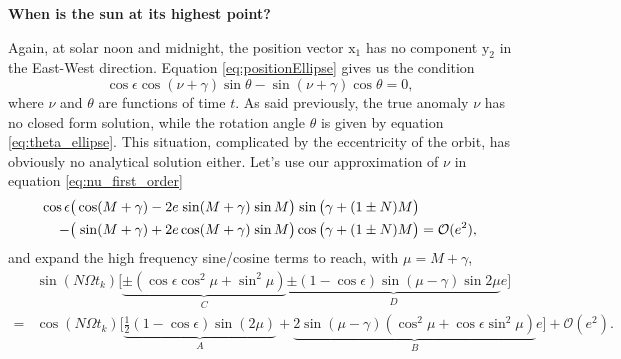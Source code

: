 \documentclass[12pt]{article}
\newcommand{\Sin}{%
  \mathop{\sbox0{$\cos$}\makebox[\wd0][r]{$\sin$}}%
}
\begin{document}
\pagebreak
\textbf{When is the sun at its highest point?}

Again, at solar noon and midnight, the position vector $\mathrm{x}_1$ has no 
component $\mathrm{y}_2$ in the East-West direction. 
Equation \eqref{eq:positionEllipse} gives us the condition
\begin{equation}
    \cos\epsilon \cos(\nu+\gamma) \sin\theta - \sin(\nu+\gamma) \cos\theta = 0,
    \label{eq:noon_time_ellipse}
\end{equation}
where $\nu$ and $\theta$ are functions of time $t$. As said previously, the
true anomaly $\nu$ has no closed form solution, while the rotation angle
$\theta$ is given by equation \eqref{eq:theta_ellipse}. This situation, 
complicated by the eccentricity of the orbit, has obviously no analytical 
solution either.
Let's use our approximation of $\nu$ in equation \eqref{eq:nu_first_order}
\begin{equation}
    \begin{aligned}
        \cos \epsilon &\big(
            \cos (M+\gamma) - 2e \Sin(M+\gamma) \Sin M
        \big) \Sin\big(
            \gamma + (1 \pm N)M
        \big)\\
        -&\big(
            \Sin (M+\gamma) + 2e\cos(M+\gamma)\Sin M
        \big) \cos\big(
            \gamma + (1 \pm N)M
        \big) = \mathcal{O}(e^2),
    \end{aligned}
\end{equation}
and expand the high frequency sine/cosine terms to reach, with $\mu=M+\gamma$,
\begin{equation}
    \begin{aligned}
        &\sin(N\Omega t_k) \Big[
            \underbrace{\pm(\cos\epsilon \cos^2\mu + \sin^2\mu)}_{C} 
            \underbrace{
                \pm(1 - \cos\epsilon) \sin (\mu-\gamma)\sin 2\mu
            }_D e
        \Big] \\
        = &\cos(N\Omega t_k) \Big[
            \underbrace{\tfrac{1}{2}(1 - \cos\epsilon) \sin(2\mu)}_A 
            + \underbrace{
                2\sin(\mu-\gamma) (\cos^2 \mu + \cos \epsilon \sin^2 \mu)
            }_B e \Big]
        +\mathcal{O}(e^2).
    \end{aligned}
    \label{eq:noon_time_first_order}
\end{equation}
\end{document}

